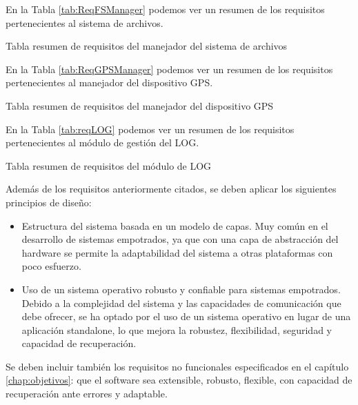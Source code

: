 En la Tabla \ref{tab:ReqFSManager} podemos ver un resumen de los requisitos pertenecientes al sistema de archivos.\\

\begin{table}[h!]
\centering

\caption {Tabla resumen de requisitos del manejador del sistema de archivos}
\label{tab:ReqFSManager}
\end{table}

En la Tabla \ref{tab:ReqGPSManager} podemos ver un resumen de los requisitos pertenecientes al manejador del dispositivo GPS.\\

\begin{table}[h!]
\centering

\caption {Tabla resumen de requisitos del manejador del dispositivo GPS}
\label{tab:ReqGPSManager}
\end{table}

En la Tabla \ref{tab:reqLOG} podemos ver un resumen de los requisitos pertenecientes al módulo de gestión del LOG.\\

\begin{table}[h!]
\centering

\caption {Tabla resumen de requisitos del módulo de LOG}
\label{tab:reqLOG}
\end{table}

Además de los requisitos anteriormente citados, se deben aplicar los siguientes principios de diseño:
\begin{itemize}
\item Estructura del sistema basada en un modelo de capas. Muy común en el desarrollo de sistemas empotrados, ya que con una capa de abstracción del hardware se permite la adaptabilidad del sistema a otras plataformas con poco esfuerzo.
\item Uso de un sistema operativo robusto y confiable para sistemas empotrados. Debido a la complejidad del sistema y las capacidades de comunicación que debe ofrecer, se ha optado por el uso de un sistema operativo en lugar de una aplicación standalone, lo que mejora la robustez, flexibilidad, seguridad y capacidad de recuperación.\\
\end{itemize}

Se deben incluir también los requisitos no funcionales especificados en el capítulo \ref{chap:objetivos}: que el software sea extensible, robusto, flexible, con capacidad de recuperación ante errores y adaptable.\\

